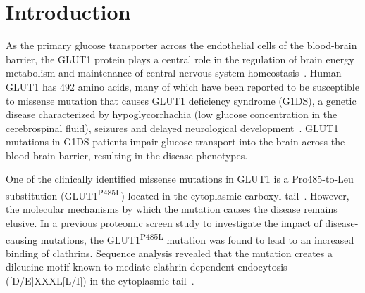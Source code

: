 
\chapter{Introduction} %
\label{Chapter1} %

As the primary glucose transporter across the endothelial cells of the blood-brain barrier, the GLUT1 protein plays a central role in the regulation of brain energy metabolism and maintenance of central nervous system homeostasis~\cite{Pascual}. Human GLUT1 has 492 amino acids, many of which have been reported to be susceptible to missense mutation that causes GLUT1 deficiency syndrome (G1DS), a genetic disease characterized by hypoglycorrhachia (low glucose concentration in the cerebrospinal fluid), seizures and delayed neurological development~\cite{Pascual,De}. GLUT1 mutations in G1DS patients impair glucose transport into the brain across the blood-brain barrier, resulting in the disease phenotypes. 

One of the clinically identified missense mutations in GLUT1 is a Pro485-to-Leu substitution (GLUT1\textsuperscript{P485L}) located in the cytoplasmic carboxyl tail~\cite{Pascual,Slaughter}. However, the molecular mechanisms by which the mutation causes the disease remains elusive. In a previous proteomic screen study to investigate the impact of disease-causing mutations, the GLUT1\textsuperscript{P485L} mutation was found to lead to an increased binding of clathrins. Sequence analysis revealed that the mutation creates a dileucine motif known to mediate clathrin-dependent endocytosis ([D/E]XXXL[L/I]) in the cytoplasmic tail~\cite{Pandey,Dinkel}.



